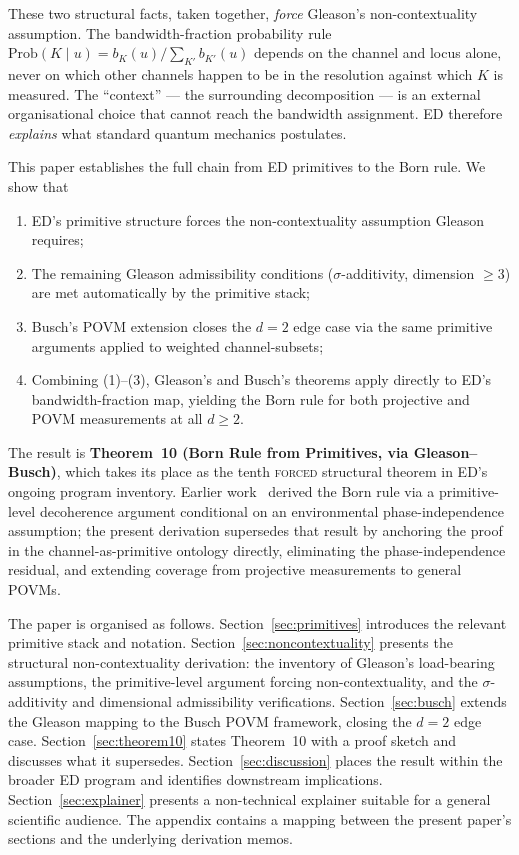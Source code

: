 \documentclass[11pt,a4paper]{article}
\begin{document}
These two structural facts, taken together, \emph{force} Gleason's non-contextuality assumption. The bandwidth-fraction probability rule $\mathrm{Prob}(K \mid u) = b_K(u) / \sum_{K'} b_{K'}(u)$ depends on the channel and locus alone, never on which other channels happen to be in the resolution against which $K$ is measured. The ``context'' --- the surrounding decomposition --- is an external organisational choice that cannot reach the bandwidth assignment. ED therefore \emph{explains} what standard quantum mechanics postulates.

This paper establishes the full chain from ED primitives to the Born rule. We show that
\begin{enumerate}
  \item ED's primitive structure forces the non-contextuality assumption Gleason requires;
  \item The remaining Gleason admissibility conditions ($\sigma$-additivity, dimension $\geq 3$) are met automatically by the primitive stack;
  \item Busch's POVM extension closes the $d = 2$ edge case via the same primitive arguments applied to weighted channel-subsets;
  \item Combining (1)--(3), Gleason's and Busch's theorems apply directly to ED's bandwidth-fraction map, yielding the Born rule for both projective and POVM measurements at all $d \geq 2$.
\end{enumerate}

The result is \textbf{Theorem~10 (Born Rule from Primitives, via Gleason--Busch)}, which takes its place as the tenth \textsc{forced} structural theorem in ED's ongoing program inventory. Earlier work~\cite[\S 3.3]{phase1} derived the Born rule via a primitive-level decoherence argument conditional on an environmental phase-independence assumption; the present derivation supersedes that result by anchoring the proof in the channel-as-primitive ontology directly, eliminating the phase-independence residual, and extending coverage from projective measurements to general POVMs.

The paper is organised as follows. Section~\ref{sec:primitives} introduces the relevant primitive stack and notation. Section~\ref{sec:noncontextuality} presents the structural non-contextuality derivation: the inventory of Gleason's load-bearing assumptions, the primitive-level argument forcing non-contextuality, and the $\sigma$-additivity and dimensional admissibility verifications. Section~\ref{sec:busch} extends the Gleason mapping to the Busch POVM framework, closing the $d = 2$ edge case. Section~\ref{sec:theorem10} states Theorem~10 with a proof sketch and discusses what it supersedes. Section~\ref{sec:discussion} places the result within the broader ED program and identifies downstream implications. Section~\ref{sec:explainer} presents a non-technical explainer suitable for a general scientific audience. The appendix contains a mapping between the present paper's sections and the underlying derivation memos.
\end{document}
